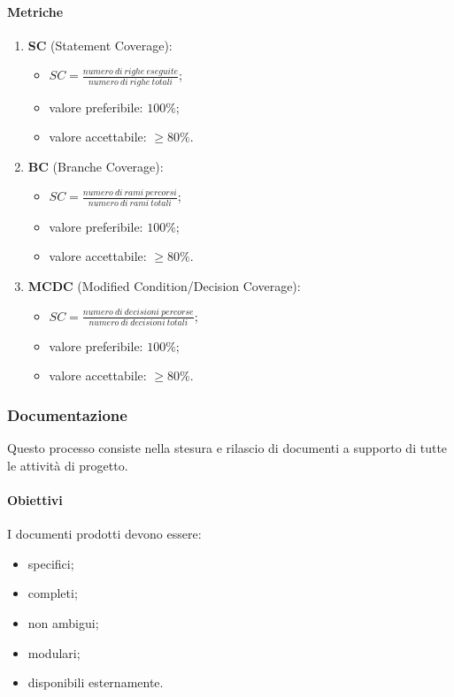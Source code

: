         \paragraph{Metriche}
            \begin{enumerate}
                \item \textbf{SC} (Statement Coverage):
                \begin{itemize}
                    \item $SC = \frac{numero\ di\ righe\ eseguite}{numero\ di\ righe\ totali}$;
                    \item valore preferibile: $100\%$;
                    \item valore accettabile: $\geq 80\%$.
                \end{itemize}
                \item \textbf{BC} (Branche Coverage):
                \begin{itemize}
                    \item $SC = \frac{numero\ di\ rami\ percorsi}{numero\ di\ rami\ totali}$;
                    \item valore preferibile: $100\%$;
                    \item valore accettabile: $\geq 80\%$.
                \end{itemize}
                \item \textbf{MCDC} (Modified Condition/Decision Coverage):
                \begin{itemize}
                    \item $SC = \frac{numero\ di\ decisioni\ percorse}{numero\ di\ decisioni\ totali}$;
                    \item valore preferibile: $100\%$;
                    \item valore accettabile: $\geq 80\%$.
                \end{itemize}
            \end{enumerate}
    \subsubsection{Documentazione}
        Questo processo consiste nella stesura e rilascio di documenti a supporto di tutte le attività di progetto.
        \paragraph{Obiettivi}
            I documenti prodotti devono essere:
            \begin{itemize}
                \item specifici;
                \item completi;
                \item non ambigui;
                \item modulari;
                \item disponibili esternamente.
            \end{itemize}
